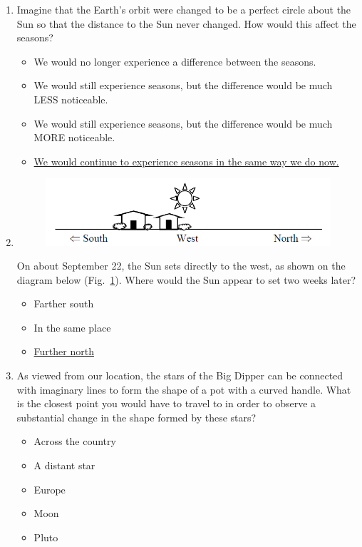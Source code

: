 \documentclass[12pt]{article}
\begin{document}
\begin{enumerate}
\begin{itemize}
\end{itemize}
\item
Imagine that the Earth's orbit were changed to be a perfect circle about the Sun so that the distance to the Sun never changed. How would this affect the seasons?
\begin{itemize}
    \item We would no longer experience a difference between the seasons.
    \item We would still experience seasons, but the difference would be much LESS noticeable.
    \item We would still experience seasons, but the difference would be much MORE noticeable.
    \item \underline{We would continue to experience seasons in the same way we do now.} 
\end{itemize}
\item
\begin{figure}[htbp]
    \centering
    \includegraphics{asq5.png}
    \caption{}
    \label{fig:asq5}
\end{figure}
On about September 22, the Sun sets directly to the west, as shown on the diagram below (Fig.~\ref{fig:asq5}). Where would the Sun appear to set two weeks later?
\begin{itemize}
    \item Farther south
    \item In the same place
    \item \underline{Further north}
\end{itemize}
\item
As viewed from our location, the stars of the Big Dipper can be connected with imaginary lines to form the shape of a pot with a curved handle. What is the closest point you would have to travel to in order to observe a substantial change in the shape formed by these stars?
\begin{itemize}
    \item Across the country
    \item A distant star
    \item Europe
    \item Moon
    \item Pluto

\end{itemize}
\end{enumerate}
\end{document}

